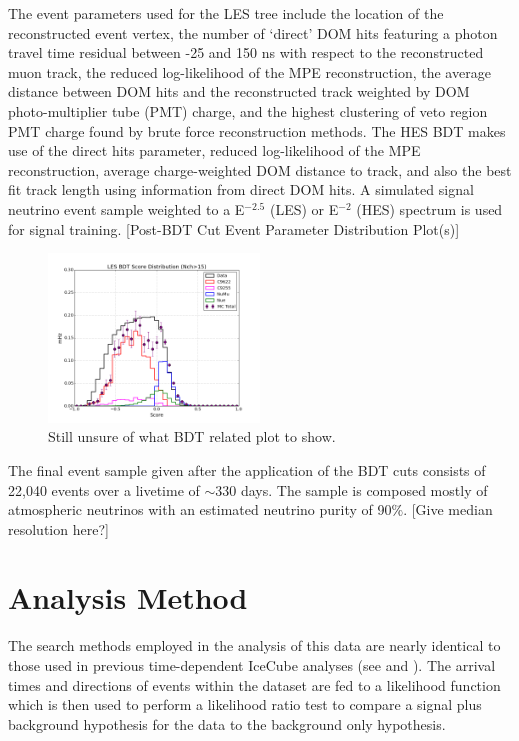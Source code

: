 \documentclass[manuscript]{aastex}
\begin{document}
The event parameters used for the LES tree include the location of the reconstructed event vertex, the number of `direct' DOM hits featuring a photon travel time residual between -25 and 150 ns with respect to the reconstructed muon track, the reduced log-likelihood of the MPE reconstruction, the average distance between DOM hits and the reconstructed track weighted by DOM photo-multiplier tube (PMT) charge, and the highest clustering of veto region PMT charge found by brute force reconstruction methods. The HES BDT makes use of the direct hits parameter, reduced log-likelihood of the MPE reconstruction, average charge-weighted DOM distance to track, and also the best fit track length using information from direct DOM hits. A simulated signal neutrino event sample weighted to a E$^{-2.5}$ (LES) or E$^{-2}$ (HES) spectrum is used for signal training.
[Post-BDT Cut Event Parameter Distribution Plot(s)]
\begin{figure}[ht]
  \begin{center}
    \includegraphics[width=0.5\textwidth,keepaspectratio]{plots/LES_BDTScoreDist_NormalizedRates_WC9255_And_H3AC9622_L6_NchCut_G1460.png}
  \end{center}
  \caption[Low-Energy Event Branch BDT Score Distribution]{Still unsure of what BDT related plot to show.}
  \label{fig:LESBDTDistribution}
\end{figure}

The final event sample given after the application of the BDT cuts consists of 22,040 events over a livetime of $\sim$330 days. The sample is composed mostly of atmospheric neutrinos with an estimated neutrino purity of 90$\%$. [Give median resolution here?]

\section{Analysis Method}
The search methods employed in the analysis of this data are nearly identical to those used in previous time-dependent IceCube analyses (see \cite{2008APh....29..299B} and \cite{2015arXiv150300598A}). The arrival times and directions of events within the dataset are fed to a likelihood function which is then used to perform a likelihood ratio test to compare a signal plus background hypothesis for the data to the background only hypothesis.
\end{document}
